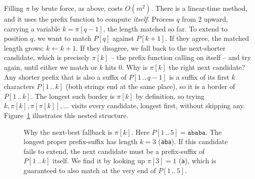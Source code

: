 Filling $\pi$ by brute force, as above, costs $O(m^2)$. There is a linear-time
method, and it uses the prefix function to compute \emph{itself}. Process
$q$ from $2$ upward, carrying a variable $k = \pi[q-1]$, the length matched so
far. To extend to position $q$, we want to match $P[q]$ against $P[k+1]$. If they
agree, the matched length grows: $k \leftarrow k+1$. If they disagree, we fall
back to the next-shorter candidate, which is precisely $\pi[k]$ -- the prefix
function calling on itself -- and try again, until either we match or $k$ hits
$0$. Why is $\pi[k]$ the right next candidate? Any shorter prefix that is also a
suffix of $P[1\,..\,q-1]$ is a suffix of its first $k$ characters $P[1\,..\,k]$
(both strings end at the same place), so it is a border of $P[1\,..\,k]$. The
longest such border is $\pi[k]$ by definition, so trying $k, \pi[k],
\pi[\pi[k]], \ldots$ visits every candidate, longest first, without skipping any. Figure~\ref{ch31:fig-nested-fallback} illustrates this nested structure.

\begin{figure}[H]
\centering
{}
\caption{Why the next-best fallback is $\pi[k]$. Here $P[1\,..\,5] = \texttt{ababa}$. The longest proper prefix-suffix has length $k=3$ (\texttt{aba}). If this candidate fails to extend, the next candidate must be a prefix-suffix of $P[1\,..\,k]$ itself. We find it by looking up $\pi[3] = 1$ (\texttt{a}), which is guaranteed to also match at the very end of $P[1\,..\,5]$.}
\label{ch31:fig-nested-fallback}
\end{figure}

